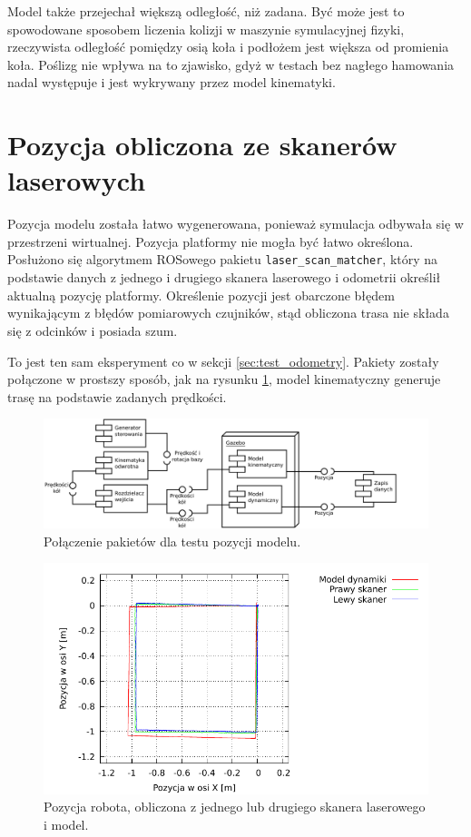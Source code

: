 		Model także przejechał większą odległość, niż zadana. Być może jest to spowodowane sposobem liczenia kolizji w maszynie symulacyjnej fizyki, rzeczywista odległość pomiędzy osią koła i podłożem jest większa od promienia koła. Poślizg nie wpływa na to zjawisko, gdyż w testach bez nagłego hamowania nadal występuje i jest wykrywany przez model kinematyki.
		
\section{Pozycja obliczona ze skanerów laserowych}
	\label{sec:test_pose}
	Pozycja modelu została łatwo wygenerowana, ponieważ symulacja odbywała się w przestrzeni wirtualnej.
	Pozycja platformy nie mogła być łatwo określona. Posłużono się algorytmem ROSowego pakietu \texttt{laser\_scan\_matcher}, który na podstawie 
	danych z jednego i drugiego skanera laserowego i odometrii określił aktualną pozycję platformy. Określenie pozycji jest obarczone błędem wynikającym
	z błędów pomiarowych czujników, stąd obliczona trasa nie składa się z odcinków i posiada szum.
	
	To jest ten sam eksperyment co w sekcji \ref{sec:test_odometry}.
	Pakiety zostały połączone w prostszy sposób, jak na rysunku \ref{uml:test_pose}, model kinematyczny generuje trasę na podstawie zadanych prędkości.
	
	\begin{figure}[H]
		\centering
		\includegraphics[width=\textwidth]{uml/gramofon.pdf}
		\caption{Połączenie pakietów dla testu pozycji modelu.}
		\label{uml:test_pose}
	\end{figure}
	
	\begin{figure}[H]
		\centering
		\includegraphics[width=\textwidth]{plots/matcher.pdf}
		\caption{Pozycja robota, obliczona z jednego lub drugiego skanera laserowego i model.}
		\label{plot:pose}
	\end{figure}
	
